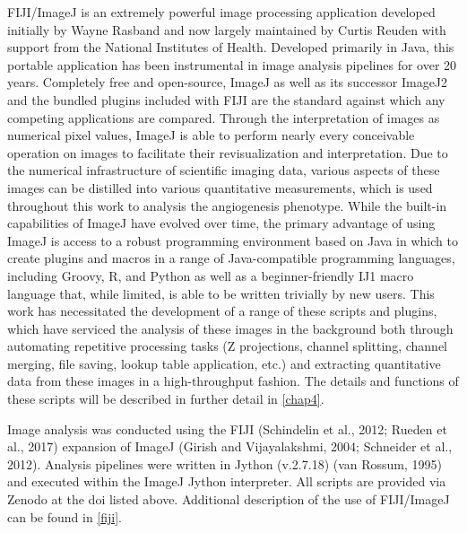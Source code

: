 FIJI/ImageJ is an extremely powerful image processing application developed initially by Wayne Rasband and now largely maintained by Curtis Reuden with support from the National Institutes of Health. Developed primarily in Java, this portable application has been instrumental in image analysis pipelines for over 20 years. Completely free and open-source, ImageJ as well as its successor ImageJ2 and the bundled plugins included with FIJI are the standard against which any competing applications are compared. Through the interpretation of images as numerical pixel values, ImageJ is able to perform nearly every conceivable operation on images to facilitate their revisualization and interpretation. Due to the numerical infrastructure of scientific imaging data, various aspects of these images can be distilled into various quantitative measurements, which is used throughout this work to analysis the angiogenesis phenotype. While the built-in capabilities of ImageJ have evolved over time, the primary advantage of using ImageJ is access to a robust programming environment based on Java in which to create plugins and macros in a range of Java-compatible programming languages, including Groovy, R, and Python as well as a beginner-friendly IJ1 macro language that, while limited, is able to be written trivially by new users. This work has necessitated the development of a range of these scripts and plugins, which have serviced the analysis of these images in the background both through automating repetitive processing tasks (Z projections, channel splitting, channel merging, file saving, lookup table application, etc.) and extracting quantitative data from these images in a high-throughput fashion. The details and functions of these scripts will be described in further detail in \autoref{chap4}. 

Image analysis was conducted using the FIJI (Schindelin et al., 2012; Rueden et al., 2017) expansion of ImageJ (Girish and Vijayalakshmi, 2004; Schneider et al., 2012). Analysis pipelines were written in Jython (v.2.7.18) (van Rossum, 1995) and executed within the ImageJ Jython interpreter. All scripts are provided via Zenodo at the doi listed above. Additional description of the use of FIJI/ImageJ can be found in \autoref{fiji}.




